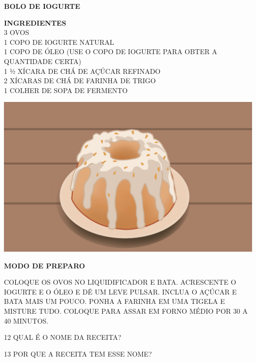 \begin{myquote}
\textbf{BOLO DE IOGURTE}

\vspace{0.3cm}

\textbf{INGREDIENTES}\\
3 OVOS\\
1 COPO DE IOGURTE NATURAL\\
1 COPO DE ÓLEO (USE O COPO DE IOGURTE PARA OBTER A QUANTIDADE CERTA)\\
1 ½ XÍCARA DE CHÁ DE AÇÚCAR REFINADO\\
2 XÍCARAS DE CHÁ DE FARINHA DE TRIGO\\
1 COLHER DE SOPA DE FERMENTO

\begin{center}
\includegraphics[width=.8\textwidth]{media/image130.png}
\end{center}

\textbf{MODO DE PREPARO}

COLOQUE OS OVOS NO LIQUIDIFICADOR E BATA. ACRESCENTE O IOGURTE E O ÓLEO E DÊ UM LEVE PULSAR. INCLUA O AÇÚCAR E BATA MAIS UM POUCO. PONHA A FARINHA EM UMA TIGELA E MISTURE TUDO. COLOQUE PARA ASSAR EM FORNO MÉDIO POR 30 A 40 MINUTOS.

\end{myquote}

\num{12} QUAL É O NOME DA RECEITA?


\num{13} POR QUE A RECEITA TEM ESSE NOME?


